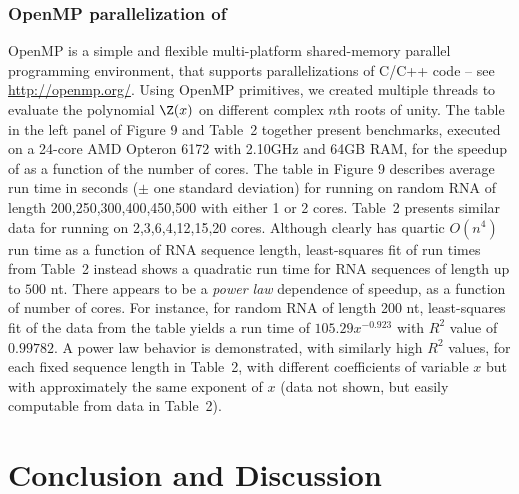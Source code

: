 \subsubsection*{OpenMP parallelization of \fftbor}

OpenMP is a simple and flexible
multi-platform shared-memory parallel programming environment, that supports
parallelizations of C/C++ code -- see \url{http://openmp.org/}.
Using OpenMP primitives, we created multiple threads to evaluate the polynomial
$\Z(x)$ on different complex $n$th roots of unity. The table in the left
panel of Figure 9
and Table~2 together present benchmarks,
executed on
a 24-core AMD Opteron 6172 with 2.10GHz and 64GB RAM, for the speedup
of \fftbor as a function of the number of cores.
The table in Figure 9 describes average
run time in seconds ($\pm$ one standard deviation) for running \fftbor
on random RNA of length 200,250,300,400,450,500 with either 1 or 2 cores.
Table~2 presents similar data for running
\fftbor on 2,3,6,4,12,15,20 cores.
Although \fftbor clearly has quartic $O(n^4)$ run time as a function of
RNA sequence length, least-squares fit
of run times from
Table~2 instead
shows a quadratic
run time for RNA sequences of length up to $500$ nt. There appears to be
a {\em power law} dependence of \fftbor
speedup, as a function of number of cores. For instance, for random RNA of
length 200 nt, least-squares fit of the data from the table yields
a run time of $105.29 x^{-0.923}$ with  $R^2$ value of
$0.99782$. A power law behavior is demonstrated, with similarly high
$R^2$ values, for each fixed sequence length in
Table~2, with different
coefficients of variable $x$ but with approximately the
same exponent of $x$ (data not shown, but easily computable from data in
Table~2).

\section*{Conclusion and Discussion}

